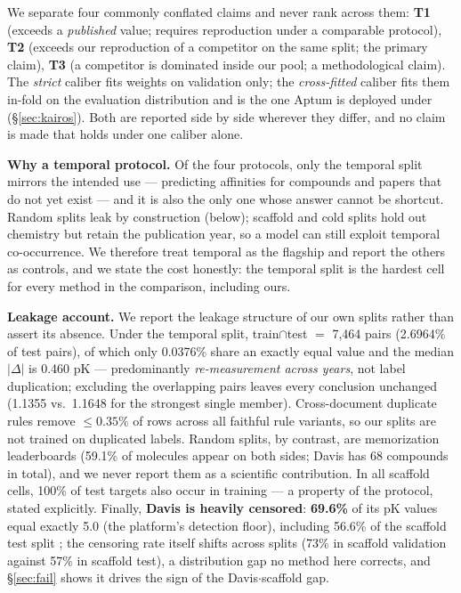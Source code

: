 \documentclass[10pt,letterpaper]{article}
\begin{document}
We separate four commonly conflated claims and never rank across them:
\textbf{T1} (exceeds a \emph{published} value; requires reproduction under a
comparable protocol), \textbf{T2} (exceeds our reproduction of a competitor on the
same split; the primary claim), \textbf{T3} (a competitor is dominated inside our
pool; a methodological claim). The \emph{strict} caliber fits weights on validation
only; the \emph{cross-fitted} caliber fits them in-fold on the evaluation
distribution and is the one Aptum is deployed under (\S\ref{sec:kairos}). Both are
reported side by side wherever they differ, and no claim is made that holds under one
caliber alone.

\textbf{Why a temporal protocol.} Of the four protocols, only the temporal split
mirrors the intended use --- predicting affinities for compounds and papers that do
not yet exist --- and it is also the only one whose answer cannot be shortcut. Random
splits leak by construction (below); scaffold and cold splits hold out chemistry but
retain the publication year, so a model can still exploit temporal co-occurrence. We
therefore treat temporal as the flagship and report the others as controls, and we
state the cost honestly: the temporal split is the hardest cell for every method in
the comparison, including ours.

\textbf{Leakage account.} We report the leakage structure of our own splits rather
than assert its absence. Under the temporal split, train$\cap$test $=$ 7,464 pairs
(2.6964\% of test pairs), of which only 0.0376\% share an exactly equal value and the
median $|\Delta|$ is 0.460 pK --- predominantly \emph{re-measurement across years},
not label duplication; excluding the overlapping pairs leaves every conclusion
unchanged (1.1355 vs.\ 1.1648 for the strongest single member). Cross-document
duplicate rules remove $\le 0.35\%$ of rows across all faithful rule variants, so our
splits are not trained on duplicated labels. Random splits, by contrast, are
memorization leaderboards (59.1\% of molecules appear on both sides; Davis has 68
compounds in total), and we never report them as a scientific contribution. In all
scaffold cells, 100\% of test targets also occur in training --- a property of the
protocol, stated explicitly. Finally, \textbf{Davis is heavily censored}:
\textbf{69.6\%} of its pK values equal exactly 5.0 (the platform's detection floor),
including 56.6\% of the scaffold test split \citep{tobin1958}; the censoring rate itself shifts across
splits (73\% in scaffold validation against 57\% in scaffold test), a distribution
gap no method here corrects, and \S\ref{sec:fail} shows it drives the sign of the
Davis$\cdot$scaffold gap.
\end{document}
